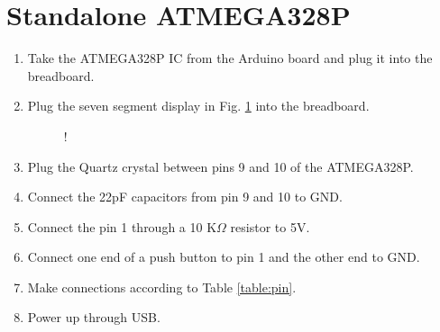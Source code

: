 \documentclass[journal,12pt,twocolumn]{IEEEtran}
\begin{document}
\section{Standalone ATMEGA328P}
\begin{enumerate}[1.]
\item
Take the ATMEGA328P IC from the Arduino board and plug it into the breadboard.

%
\item
Plug the seven segment display in Fig. \ref{fig:sevenseg} into the breadboard.


\begin{figure}[!h]
\begin{center}
 {!} {

}
\end{center}
\caption{}
\label{fig:sevenseg}
\end{figure}

\item
Plug the Quartz crystal between pins 9 and 10 of the ATMEGA328P.

%
\item
Connect the 22pF capacitors from pin 9 and 10 to GND.

%
%
\item
Connect the pin 1 through a 10 K$\Omega$ resistor to 5V.

%
%
\item
Connect one end of a push button to pin 1 and the other end to GND.

%
%
\item
Make connections according to Table \ref{table:pin}.

%

\item
Power up through USB.
\end{enumerate}
\end{document}
